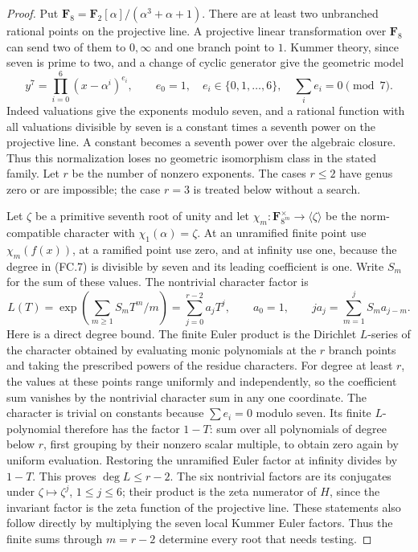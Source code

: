 \begin{proof}
Put $\mathbf F _8=\mathbf F _2[\alpha]/(\alpha^3+\alpha+1)$.
There are at least two unbranched rational points on the projective
line. A projective linear transformation over $\mathbf F _8$ can
send two of them to $0,\infty$ and one branch point to $1$.
Kummer theory, since seven is prime to two, and a change of cyclic
generator give the geometric model
\[
 y^7=\prod_{i=0}^6(x-\alpha^i)^{e_i},\qquad
 e_0=1,\quad e_i\in\{0,1,\ldots,6\},\quad
                       \sum_i e_i=0\pmod7.                 \tag{FC.7}
\]
Indeed valuations give the exponents modulo seven, and a rational
function with all valuations divisible by seven is a constant times
a seventh power on the projective line. A constant becomes a seventh
power over the algebraic closure. Thus this normalization loses no
geometric isomorphism class in the stated family. Let $r$ be the
number of nonzero exponents. The cases $r\le2$ have genus zero or
are impossible; the case $r=3$ is treated below without a search.

Let $\zeta$ be a primitive seventh root of unity and let
$\chi_m:\mathbf F _{8^m}^{\times}\to\langle\zeta\rangle$
be the norm-compatible character with $\chi_1(\alpha)=\zeta$.
At an unramified finite point use $\chi_m(f(x))$, at a ramified
point use zero, and at infinity use one, because the degree in
(FC.7) is divisible by seven and its leading coefficient is one.
Write $S_m$ for the sum of these values. The nontrivial character
factor is
\[
 L(T)=\exp\left(\sum_{m\ge1}S_mT^m/m\right)
     =\sum_{j=0}^{r-2}a_jT^j,
 \qquad a_0=1,\qquad
             j a_j=\sum_{m=1}^jS_ma_{j-m}.                 \tag{FC.8}
\]
Here is a direct degree bound. The finite Euler product is the
Dirichlet $L$-series of the character obtained by evaluating monic
polynomials at the $r$ branch points and taking the prescribed
powers of the residue characters. For degree at least $r$, the
values at these points range uniformly and independently, so the
coefficient sum vanishes by the nontrivial character sum in any one
coordinate. The character is trivial on constants because
$\sum e_i=0$ modulo seven. Its finite $L$-polynomial therefore has
the factor $1-T$: sum over all polynomials of degree below $r$,
first grouping by their nonzero scalar multiple, to obtain zero
again by uniform evaluation. Restoring the unramified Euler factor
at infinity divides by $1-T$. This proves $\deg L\le r-2$.
The six nontrivial factors are its conjugates under
$\zeta\mapsto\zeta^j$, $1\le j\le6$; their product is the zeta
numerator of $H$, since the invariant factor is the zeta function
of the projective line. These statements also follow directly by
multiplying the seven local Kummer Euler factors. Thus the finite
sums through $m=r-2$ determine every root that needs testing.


\end{proof}
